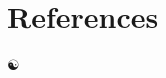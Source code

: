 \documentclass[a4paper,11pt]{article}
\begin{document}

\newpage



\section{References}

\begingroup
\renewcommand{\section}[2]{}%


\begin{center}
\vspace{1cm}
\(\yinyang\)
\end{center}
\end{document}
